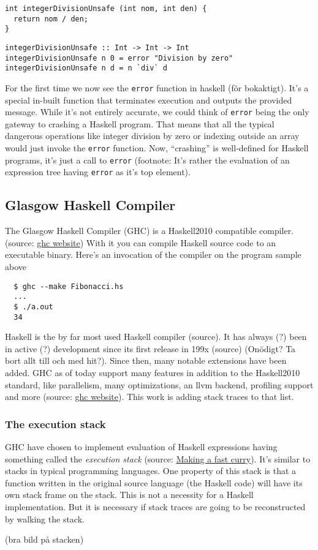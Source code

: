 \begin{verbatim}
int integerDivisionUnsafe (int nom, int den) {
  return nom / den;
}
\end{verbatim}

\begin{verbatim}
integerDivisionUnsafe :: Int -> Int -> Int
integerDivisionUnsafe n 0 = error "Division by zero"
integerDivisionUnsafe n d = n `div` d
\end{verbatim}

For the first time we now see the \texttt{error} function in haskell (för bokaktigt).
It's a special in-built function that terminates execution and outputs
the provided message. While it's not entirely accurate, we could think of
\texttt{error} being the only gateway to crashing a Haskell program. That
means that all the typical dangerous operations like integer division by
zero or indexing outside an array would just invoke the
\texttt{error} function. Now, ``crashing'' is well-defined for Haskell
programs, it's just a call to \texttt{error} (footnote: It's rather the
evaluation of an expression tree having \texttt{error} as it's top
element).

\subsection{Glasgow Haskell Compiler}

The Glasgow Haskell Compiler (GHC) is a Haskell2010 compatible compiler.
(source: \href{http://www.haskell.org/ghc/}{ghc website}) With it you can compile Haskell source code to an executable
binary. Here's an invocation of the compiler on the program sample above

\begin{verbatim}
  $ ghc --make Fibonacci.hs
  ...
  $ ./a.out
  34
\end{verbatim}

Haskell is the by far most used Haskell compiler (source). It has always (?)
been in active (?) development since its first release in 199x (source) (Onödigt? Ta
bort allt till och med hit?). Since then, many notable extensions have been
added. GHC as of today support many features in addition to the Haskell2010
standard, like parallelism, many optimizations, an llvm backend, profiling
support and more (source: \href{http://www.haskell.org/ghc/}{ghc website}). This
work is adding stack traces to that list.

\subsubsection{The execution stack}

GHC have chosen to implement evaluation of Haskell expressions having
something called the \emph{execution stack}
(source: \href{http://community.haskell.org/~simonmar/papers/evalapplyjfp06.pdf}{Making a fast curry}).
It's similar to stacks in typical programming languages. One property of this
stack is that a function written in the original source language (the Haskell
code) will have its own stack frame on the stack. This is not a
necessity for a Haskell implementation. But it is necessary if stack traces are
going to be reconstructed by walking the stack.

(bra bild på stacken)
